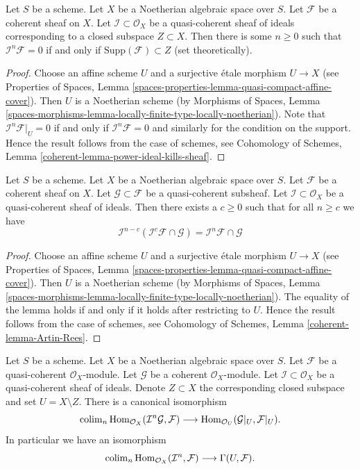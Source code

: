 \begin{lemma}
\label{lemma-power-ideal-kills-sheaf}
Let $S$ be a scheme. Let $X$ be a Noetherian algebraic space over $S$.
Let $\mathcal{F}$ be a coherent sheaf on $X$. Let
$\mathcal{I} \subset \mathcal{O}_X$ be a quasi-coherent sheaf of ideals
corresponding to a closed subspace $Z \subset X$. Then there is some
$n \geq 0$ such that $\mathcal{I}^n\mathcal{F} = 0$ if and only if
$\text{Supp}(\mathcal{F}) \subset Z$ (set theoretically).
\end{lemma}

\begin{proof}
Choose an affine scheme $U$ and a surjective \'etale morphism $U \to X$
(see Properties of Spaces, Lemma
\ref{spaces-properties-lemma-quasi-compact-affine-cover}).
Then $U$ is a Noetherian scheme (by
Morphisms of Spaces, Lemma
\ref{spaces-morphisms-lemma-locally-finite-type-locally-noetherian}).
Note that $\mathcal{I}^n\mathcal{F}|_U = 0$ if and only if
$\mathcal{I}^n\mathcal{F} = 0$ and similarly for the condition on
the support. Hence the result follows from the case of schemes, see
Cohomology of Schemes, Lemma \ref{coherent-lemma-power-ideal-kills-sheaf}.
\end{proof}

\begin{lemma}
\label{lemma-Artin-Rees}
Let $S$ be a scheme. Let $X$ be a Noetherian algebraic space over $S$.
Let $\mathcal{F}$ be a coherent sheaf on $X$. Let
$\mathcal{G} \subset \mathcal{F}$ be a quasi-coherent subsheaf.
Let $\mathcal{I} \subset \mathcal{O}_X$ be a quasi-coherent sheaf of
ideals. Then there exists a $c \geq 0$ such that for all $n \geq c$ we
have
$$
\mathcal{I}^{n - c}(\mathcal{I}^c\mathcal{F} \cap \mathcal{G})
=
\mathcal{I}^n\mathcal{F} \cap \mathcal{G}
$$
\end{lemma}

\begin{proof}
Choose an affine scheme $U$ and a surjective \'etale morphism $U \to X$
(see Properties of Spaces, Lemma
\ref{spaces-properties-lemma-quasi-compact-affine-cover}).
Then $U$ is a Noetherian scheme (by
Morphisms of Spaces, Lemma
\ref{spaces-morphisms-lemma-locally-finite-type-locally-noetherian}).
The equality of the lemma holds if and only if it holds after
restricting to $U$. Hence the result follows from the case of schemes, see
Cohomology of Schemes, Lemma \ref{coherent-lemma-Artin-Rees}.
\end{proof}

\begin{lemma}
\label{lemma-homs-over-open}
Let $S$ be a scheme. Let $X$ be a Noetherian algebraic space over $S$.
Let $\mathcal{F}$ be a quasi-coherent $\mathcal{O}_X$-module.
Let $\mathcal{G}$ be a coherent $\mathcal{O}_X$-module.
Let $\mathcal{I} \subset \mathcal{O}_X$ be a quasi-coherent sheaf of
ideals. Denote $Z \subset X$ the corresponding closed subspace and
set $U = X \setminus Z$. There is a canonical isomorphism
$$
\mathop{\mathrm{colim}}\nolimits_n \mathop{\mathrm{Hom}}\nolimits_{\mathcal{O}_X}(\mathcal{I}^n\mathcal{G}, \mathcal{F})
\longrightarrow
\mathop{\mathrm{Hom}}\nolimits_{\mathcal{O}_U}(\mathcal{G}|_U, \mathcal{F}|_U).
$$
In particular we have an isomorphism
$$
\mathop{\mathrm{colim}}\nolimits_n \mathop{\mathrm{Hom}}\nolimits_{\mathcal{O}_X}(\mathcal{I}^n, \mathcal{F})
\longrightarrow
\Gamma(U, \mathcal{F}).
$$
\end{lemma}

